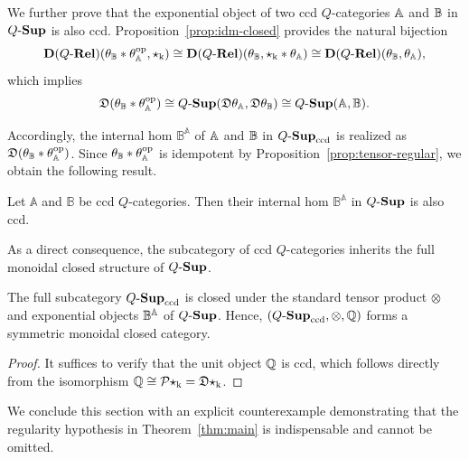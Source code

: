 \documentclass{tac}
\begin{document}
We further prove that the exponential object of two ccd $Q$-categories $\mathbb{A}$ and $\mathbb{B}$ in ${Q\text{-}\mathbf{Sup}}$ is also ccd. Proposition~\ref{prop:idm-closed} provides the natural bijection
\[
\mathbf{D}(Q\text{-}\mathbf{Rel})(\theta_{\mathbb{B}}\ast\theta_{\mathbb{A}}^{\mathrm{op}},\star_{\mathrm{k}})
\cong\mathbf{D}(Q\text{-}\mathbf{Rel})(\theta_{\mathbb{B}},\star_{\mathrm{k}}*\theta_{\mathbb{A}})\cong \mathbf{D}(Q\text{-}\mathbf{Rel})(\theta_{\mathbb{B}},\theta_{\mathbb{A}}),
\]
which implies
\[
\mathfrak{D}(\theta_{\mathbb{B}}\ast\theta_{\mathbb{A}}^{\mathrm{op}})
\cong{Q\text{-}\mathbf{Sup}}(\mathfrak{D}\theta_{\mathbb{A}},\mathfrak{D}\theta_{\mathbb{B}})
\cong{Q\text{-}\mathbf{Sup}}(\mathbb{A},\mathbb{B}).
\]

Accordingly, the internal hom $\mathbb{B}^{\mathbb{A}}$ of $\mathbb{A}$ and $\mathbb{B}$ in ${Q\text{-}\mathbf{Sup}}_{\mathrm{ccd}}$ is realized as $\mathfrak{D}(\theta_{\mathbb{B}}\ast\theta_{\mathbb{A}}^{\mathrm{op}})$. Since $\theta_{\mathbb{B}}\ast\theta_{\mathbb{A}}^{\mathrm{op}}$ is idempotent by Proposition~\ref{prop:tensor-regular}, we obtain the following result.

\begin{proposition}\label{prop:internal-hom-ccd}
Let $\mathbb{A}$ and $\mathbb{B}$ be ccd $Q$-categories. Then their internal hom $\mathbb{B}^{\mathbb{A}}$ in ${Q\text{-}\mathbf{Sup}}$ is also ccd.
\end{proposition}

As a direct consequence, the subcategory of ccd $Q$-categories inherits the full monoidal closed structure of ${Q\text{-}\mathbf{Sup}}$.

\begin{corollary}\label{cor:ccd-monoidal}
The full subcategory ${Q\text{-}\mathbf{Sup}}_{\mathrm{ccd}}$ is closed under the standard tensor product $\otimes$ and exponential objects $\mathbb{B}^{\mathbb{A}}$ of ${Q\text{-}\mathbf{Sup}}$. Hence, $({Q\text{-}\mathbf{Sup}}_\mathrm{ccd},\otimes,\mathbb{Q})$ forms a symmetric monoidal closed category.
\end{corollary}

\begin{proof}
It suffices to verify that the unit object $\mathbb{Q}$ is ccd, which follows directly from the isomorphism $\mathbb{Q}\cong\mathcal{P}\star_\mathrm{k}=\mathfrak{D}\star_\mathrm{k}$.
\end{proof}

We conclude this section with an explicit counterexample demonstrating that the regularity hypothesis in Theorem~\ref{thm:main} is indispensable and cannot be omitted.
\end{document}
